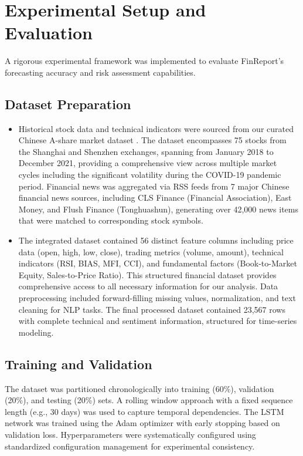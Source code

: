 \documentclass[3p,times,procedia]{elsarticle}
\begin{document}
\section{Experimental Setup and Evaluation}
A rigorous experimental framework was implemented to evaluate FinReport's forecasting accuracy and risk assessment capabilities.

\subsection{Dataset Preparation}
\begin{itemize}

\item Historical stock data and technical indicators were sourced from our curated Chinese A-share market dataset \cite{FinReportDataset2025}. The dataset encompasses 75 stocks from the Shanghai and Shenzhen exchanges, spanning from January 2018 to December 2021, providing a comprehensive view across multiple market cycles including the significant volatility during the COVID-19 pandemic period. Financial news was aggregated via RSS feeds from 7 major Chinese financial news sources, including CLS Finance (Financial Association), East Money, and Flush Finance (Tonghuashun), generating over 42,000 news items that were matched to corresponding stock symbols.
\item The integrated dataset \cite{FinReportDataset2025} contained 56 distinct feature columns including price data (open, high, low, close), trading metrics (volume, amount), technical indicators (RSI, BIAS, MFI, CCI), and fundamental factors (Book-to-Market Equity, Sales-to-Price Ratio). This structured financial dataset provides comprehensive access to all necessary information for our analysis. Data preprocessing included forward-filling missing values, normalization, and text cleaning for NLP tasks. The final processed dataset contained 23,567 rows with complete technical and sentiment information, structured for time-series modeling.
\end{itemize}
\subsection{Training and Validation}
The dataset was partitioned chronologically into training (60\%), validation (20\%), and testing (20\%) sets. A rolling window approach with a fixed sequence length (e.g., 30 days) was used to capture temporal dependencies. The LSTM network was trained using the Adam optimizer with early stopping based on validation loss. Hyperparameters were systematically configured using standardized configuration management for experimental consistency.
\end{document}
